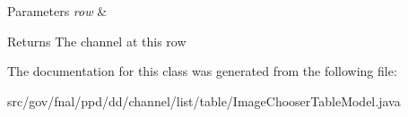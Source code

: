 \begin{DoxyParams}{Parameters}
{\em row} & \\
\hline
\end{DoxyParams}
\begin{DoxyReturn}{Returns}
The channel at this row 
\end{DoxyReturn}


The documentation for this class was generated from the following file\-:\begin{DoxyCompactItemize}
\item 
src/gov/fnal/ppd/dd/channel/list/table/Image\-Chooser\-Table\-Model.\-java\end{DoxyCompactItemize}
